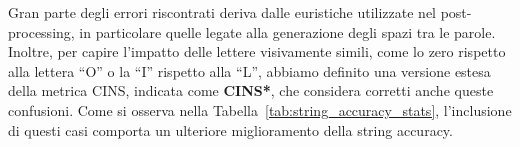 Gran parte degli errori riscontrati deriva dalle euristiche utilizzate nel post-processing, in particolare quelle legate alla generazione degli spazi tra le parole.  
Inoltre, per capire l'impatto delle lettere visivamente simili, come lo zero rispetto alla lettera “O” o la “I” rispetto alla “L”, abbiamo definito una versione estesa della metrica CINS, indicata come \textbf{CINS*}, che considera corretti anche queste confusioni.  
Come si osserva nella Tabella~\ref{tab:string_accuracy_stats}, l'inclusione di questi casi comporta un ulteriore miglioramento della string accuracy.